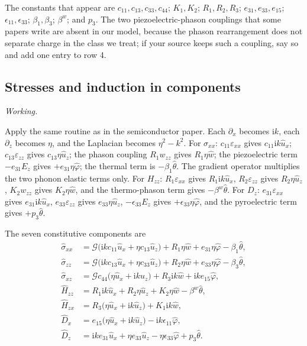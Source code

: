 \documentclass[11pt,a4paper]{article}
\newif\ifshowworked \showworkedtrue
\newenvironment{worked}{\ifshowworked\par\smallskip\noindent\textit{Working.}\par\else\setbox0\vbox\bgroup\fi}{\ifshowworked\par\smallskip\else\egroup\fi}
\newcommand{\Gc}{\mathcal{G}}
\newcommand{\eps}{\varepsilon}
\newcommand{\ii}{\mathrm{i}}
\newcommand{\bx}{\hat u_x}
\newcommand{\bz}{\hat u_z}
\newcommand{\bw}{\hat w}
\newcommand{\bp}{\hat\varphi}
\newcommand{\bt}{\hat\theta}
\newcommand{\bwth}{\beta^{w}}
\begin{document}
\noindent The constants that appear are $c_{11},c_{13},c_{33},c_{44}$; $K_1,K_2$; $R_1,R_2,R_3$;
$e_{31},e_{33},e_{15}$; $\epsilon_{11},\epsilon_{33}$; $\beta_1,\beta_3$; $\bwth$; and $p_3$. The two
piezoelectric-phason couplings that some papers write are absent in our model, because the phason
rearrangement does not separate charge in the class we treat; if your source keeps such a coupling, say so
and add one entry to row 4.

\subsection{Stresses and induction in components}

\begin{worked}
Apply the same routine as in the semiconductor paper. Each $\partial_x$ becomes $\ii k$, each $\partial_z$
becomes $\eta$, and the Laplacian becomes $\eta^2-k^2$. For $\sigma_{xx}$: $c_{11}\eps_{xx}$ gives
$c_{11}\ii k\bx$; $c_{13}\eps_{zz}$ gives $c_{13}\eta\bz$; the phason coupling $R_1w_{zz}$ gives $R_1\eta\bw$;
the piezoelectric term $-e_{31}E_z$ gives $+e_{31}\eta\bp$; the thermal term is $-\beta_1\bt$. The gradient
operator multiplies the two phonon elastic terms only. For $H_{zz}$: $R_1\eps_{xx}$ gives $R_1\ii k\bx$,
$R_2\eps_{zz}$ gives $R_2\eta\bz$, $K_2w_{zz}$ gives $K_2\eta\bw$, and the thermo-phason term gives
$-\bwth\bt$. For $D_z$: $e_{31}\eps_{xx}$ gives $e_{31}\ii k\bx$, $e_{33}\eps_{zz}$ gives $e_{33}\eta\bz$,
$-\epsilon_{33}E_z$ gives $+\epsilon_{33}\eta\bp$, and the pyroelectric term gives $+p_3\bt$.
\end{worked}

\noindent The seven constitutive components are
\begin{align}
\hat\sigma_{xx}&=\Gc\bigl(\ii kc_{11}\bx+\eta c_{13}\bz\bigr)+R_1\eta\bw+e_{31}\eta\bp-\beta_1\bt,
\label{eq:sxx}\\
\hat\sigma_{zz}&=\Gc\bigl(\ii kc_{13}\bx+\eta c_{33}\bz\bigr)+R_2\eta\bw+e_{33}\eta\bp-\beta_3\bt,
\label{eq:szz}\\
\hat\sigma_{xz}&=\Gc c_{44}\bigl(\eta\bx+\ii k\bz\bigr)+R_3\ii k\bw+\ii ke_{15}\bp,
\label{eq:sxz}\\
\hat H_{zz}&=R_1\ii k\bx+R_2\eta\bz+K_2\eta\bw-\bwth\bt,
\label{eq:Hzz}\\
\hat H_{zx}&=R_3\bigl(\eta\bx+\ii k\bz\bigr)+K_1\ii k\bw,
\label{eq:Hzx}\\
\hat D_x&=e_{15}\bigl(\eta\bx+\ii k\bz\bigr)-\ii k\epsilon_{11}\bp,
\label{eq:Dx}\\
\hat D_z&=\ii ke_{31}\bx+\eta e_{33}\bz-\eta\epsilon_{33}\bp+p_3\bt .
\label{eq:Dz}
\end{align}
\end{document}
